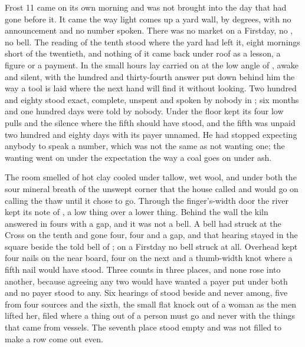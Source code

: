 
Frost 11 came on its own morning and was not brought into the day that had gone before it. It came the way light comes up a yard wall, by degrees, with no announcement and no number spoken. There was no market on a Firstday, no , no bell. The reading of the tenth stood where the yard had left it, eight mornings short of the twentieth, and nothing of it came back under  roof as a lesson, a figure or a payment. In the small hours  lay carried on  at the low angle of , awake and silent, with the hundred and thirty-fourth answer put down behind him the way a tool is laid where the next hand will find it without looking. Two hundred and eighty stood exact, complete, unspent and spoken by nobody in ; six months and one hundred days were told by nobody. Under the floor  kept its four low pulls and the silence where the fifth should have stood, and the fifth was unpaid two hundred and eighty days with its payer unnamed. He had stopped expecting anybody to speak a number, which was not the same as not wanting one; the wanting went on under the expectation the way a coal goes on under ash.

The room smelled of hot clay cooled under tallow, wet wool, and under both the sour mineral breath of the unswept corner that the house called  and would go on calling the thaw until it chose to go. Through the finger's-width door the river kept its note of , a low thing over a lower thing. Behind the wall the kiln answered in fours with a gap, and it was not a bell. A bell had struck at the Cross on the tenth and gone four, four and a gap, and that hearing stayed in the square beside the told bell of ; on a Firstday no bell struck at all. Overhead  kept four nails on the near board, four on the next and a thumb-width knot where a fifth nail would have stood. Three counts in three places, and none rose into another, because agreeing any two would have wanted a payer put under both and no payer stood to any. Six hearings of  stood beside and never among, five from four sources and the sixth, the small flat knock out of a woman as the men lifted her, filed where a thing out of a person must go and never with the things that came from vessels. The seventh place stood empty and was not filled to make a row come out even.


